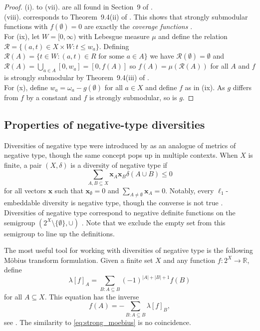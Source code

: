 \documentclass{article}
\theoremstyle{plain}
\theoremstyle{definition}
\renewcommand{\Re}{\mathbb{R}}
\newcommand{\bx}{\mathbf{x}}
\begin{document}
\begin{proof}
(i). to (vii). are all found in Section~9 of \cite{lovasz-2023-submodular-setfunctions}. \\
(viii). corresponds to Theorem~9.4(ii) of \cite{lovasz-2023-submodular-setfunctions}. This shows that strongly submodular functions with $f(\emptyset) = 0$ are exactly the {\em coverage functions} \cite{Badanidiyuru2012Sketching}. \\
For (ix), let $W = [0,\infty)$ with Lebesgue measure $\mu$ and define the relation $\mathcal{R} = \{(a,t) \in X \times W: t \leq w_a\}$. Defining $\mathcal{R}(A) = \{t \in W: (a,t) \in R \mbox{ for some $a \in A$}\}$ we have $\mathcal{R}(\emptyset) = \emptyset$ and $\mathcal{R}(A) = \bigcup_{a \in A} [0,w_a] = [0,f(A)]$ so $f(A) = \mu(\mathcal{R}(A))$ for all $A$ and $f$ is strongly submodular by Theorem~9.4(iii) of \cite{lovasz-2023-submodular-setfunctions}. \\
For (x), define $w_a = \omega_a - g(\emptyset)$ for all $a \in X$ and define $f$ as in (ix). As $g$ differs from $f$ by a constant and $f$ is strongly submodular, so is $g$. 
\end{proof}




\subsection{Properties of negative-type diversities}

Diversities of negative type were introduced by \cite{WuBryantEtal19} as an analogue of metrics of negative type, though the same concept pops up in multiple contexts. When $X$ is finite, a pair $(X,\delta)$ is a diversity of negative type if 
\[ \sum_{A,B \subseteq X} \bx_A \bx_B \delta(A \cup B) \leq 0\]
for all vectors $\bx$ such that $\bx_\emptyset = 0$ and $\sum_{A \neq \emptyset} \bx_A = 0$. Notably, every $\ell_1$-embeddable diversity is negative type, though the converse is not true \cite{WuBryantEtal19}. Diversities of negative type correspond to negative definite functions on the semigroup $(2^X \setminus  \{\emptyset\}, \cup)$ \cite{BergChristensenRessel1984}. Note that we exclude the empty set from this semigroup to line up the definitions. 

The most useful tool for working with diversities of negative type is the following M\"obius transform formulation. Given a finite set $X$ and any function $f:2^X \rightarrow \Re$, define 
\[\lambda[f]_A = \sum_{B:A \subseteq B} (-1)^{|A|+|B|+1} f(B)\]
for all $A \subseteq X$. This equation has the inverse
\[f(A) = -\sum_{B:A \subseteq B} \lambda[f]_B,\]
see \cite{WuBryantEtal19}. The similarity to \eqref{eq:strong_moebius} is no coincidence. 
\end{document}
